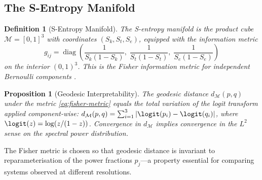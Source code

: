 \documentclass[10pt,twocolumn]{article}
\newtheorem{proposition}[theorem]{Proposition}
\newtheorem{definition}[theorem]{Definition}
\DeclareMathOperator{\diag}{diag}
\newcommand{\ManifoldM}{\mathcal{M}}
\begin{document}
\subsection{The S-Entropy Manifold}

\begin{definition}[S-Entropy Manifold]
The \emph{S-entropy manifold} is the product cube
$\ManifoldM = [0,1]^3$ with coordinates $(S_k, S_t, S_e)$,
equipped with the information metric
\begin{equation}
g_{ij} = \diag\!\left(\frac{1}{S_k(1-S_k)},\; \frac{1}{S_t(1-S_t)},\; \frac{1}{S_e(1-S_e)}\right)
\label{eq:fisher-metric}
\end{equation}
on the interior $(0,1)^3$. This is the Fisher information metric for
independent Bernoulli components \cite{amari1998}.
\end{definition}

\begin{proposition}[Geodesic Interpretability]
\label{prop:geodesic}
The geodesic distance $d_{\mathcal{M}}(p, q)$ under the metric \eqref{eq:fisher-metric}
equals the total variation of the logit transform applied component-wise:
$d_{\mathcal{M}}(p, q) = \sum_{i=1}^3 |\logit(p_i) - \logit(q_i)|$,
where $\logit(z) = \log(z/(1-z))$.
Convergence in $d_{\mathcal{M}}$ implies convergence in the
$L^2$ sense on the spectral power distribution.
\end{proposition}

The Fisher metric is chosen so that geodesic distance is invariant to
reparameterisation of the power fractions $p_j$---a property essential
for comparing systems observed at different resolutions.
\end{document}
